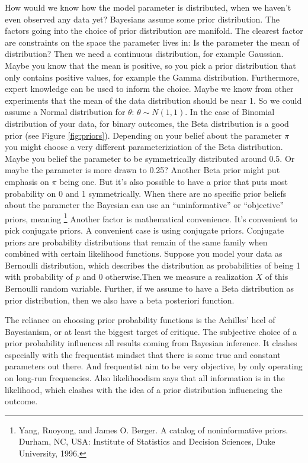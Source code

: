\documentclass[
  10pt,
]{scrbook}
\begin{document}
How would we know how the model parameter is distributed, when we haven't even observed any data yet?
Bayesians assume some prior distribution.
The factors going into the choice of prior distribution are manifold.
The clearest factor are constraints on the space the parameter lives in:
Is the parameter the mean of distribution? Then we need a continuous distribution, for example Gaussian.
Maybe you know that the mean is positive, so you pick a prior distribution that only contains positive values, for example the Gamma distribution.
Furthermore, expert knowledge can be used to inform the choice.
Maybe we know from other experiments that the mean of the data distribution should be near 1.
So we could assume a Normal distribution for \(\theta\): \(\theta \sim N(1, 1)\).
In the case of Binomial distribution of your data, for binary outcomes, the Beta distribution is a good prior (see Figure \ref{fig:priors}).
Depending on your belief about the parameter \(\pi\) you might choose a very different parameteriziation of the Beta distribution.
Maybe you belief the parameter to be symmetrically distributed around 0.5.
Or maybe the parameter is more drawn to 0.25?
Another Beta prior might put emphasis on \(\pi\) being one.
But it's also possible to have a prior that puts most probability on 0 and 1 symmetrically.
When there are no specific prior beliefs about the parameter the Bayesian can use an ``uninformative'' or ``objective'' priors, meaning \footnote{Yang, Ruoyong, and James O. Berger. A catalog of noninformative priors. Durham, NC, USA: Institute of Statistics and Decision Sciences, Duke University, 1996.}
Another factor is mathematical convenience.
It's convenient to pick conjugate priors.
A convenient case is using conjugate priors.
Conjugate priors are probability distributions that remain of the same family when combined with certain likelihood functions.
Suppose you model your data as Bernoulli distribution, which describes the distribution as probabilities of being 1 with probability of \(p\) and 0 otherwise.Then we measure a realization \(X\) of this Bernoulli random variable.
Further, if we assume to have a Beta distribution as prior distribution, then we also have a beta posteriori function.

The reliance on choosing prior probability functions is the Achilles' heel of Bayesianism, or at least the biggest target of critique.
The subjective choice of a prior probability influences all results coming from Bayesian inference.
It clashes especially with the frequentist mindset that there is some true and constant parameters out there.
And frequentist aim to be very objective, by only operating on long-run frequencies.
Also likelihoodism says that all information is in the likelihood, which clashes with the idea of a prior distribution influencing the outcome.
\end{document}
